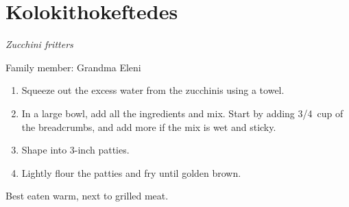 \chapter{Kolokithokeftedes}
\label{ch:kolokithokeftedes}



\textit{Zucchini fritters}

Family member: Grandma Eleni

\begin{enumerate}
    \item Squeeze out the excess water from the zucchinis using a towel.
    \item In a large bowl, add all the ingredients and mix. Start by adding 3/4~cup of the breadcrumbs, and add more if the mix is wet and sticky.
    \item Shape into 3-inch patties.
    \item Lightly flour the patties and fry until golden brown.
\end{enumerate}

Best eaten warm, next to grilled meat.
